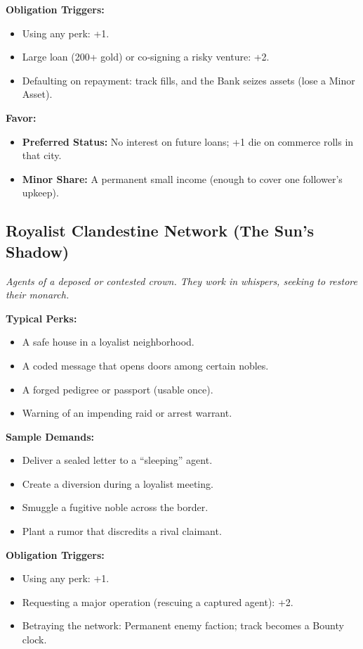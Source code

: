 \textbf{Obligation Triggers:}
\begin{itemize}
  \item Using any perk: +1.
  \item Large loan (200+ gold) or co‑signing a risky venture: +2.
  \item Defaulting on repayment: track fills, and the Bank seizes assets (lose a Minor Asset).
\end{itemize}

\textbf{Favor:}
\begin{itemize}
  \item \textbf{Preferred Status:} No interest on future loans; +1 die on commerce rolls in that city.
  \item \textbf{Minor Share:} A permanent small income (enough to cover one follower’s upkeep).
\end{itemize}

\subsection{Royalist Clandestine Network (The Sun’s Shadow)}

\textit{Agents of a deposed or contested crown. They work in whispers, seeking to restore their monarch.}

\textbf{Typical Perks:}
\begin{itemize}
  \item A safe house in a loyalist neighborhood.
  \item A coded message that opens doors among certain nobles.
  \item A forged pedigree or passport (usable once).
  \item Warning of an impending raid or arrest warrant.
\end{itemize}

\textbf{Sample Demands:}
\begin{itemize}
  \item Deliver a sealed letter to a “sleeping” agent.
  \item Create a diversion during a loyalist meeting.
  \item Smuggle a fugitive noble across the border.
  \item Plant a rumor that discredits a rival claimant.
\end{itemize}

\textbf{Obligation Triggers:}
\begin{itemize}
  \item Using any perk: +1.
  \item Requesting a major operation (rescuing a captured agent): +2.
  \item Betraying the network: Permanent enemy faction; track becomes a Bounty clock.
\end{itemize}

